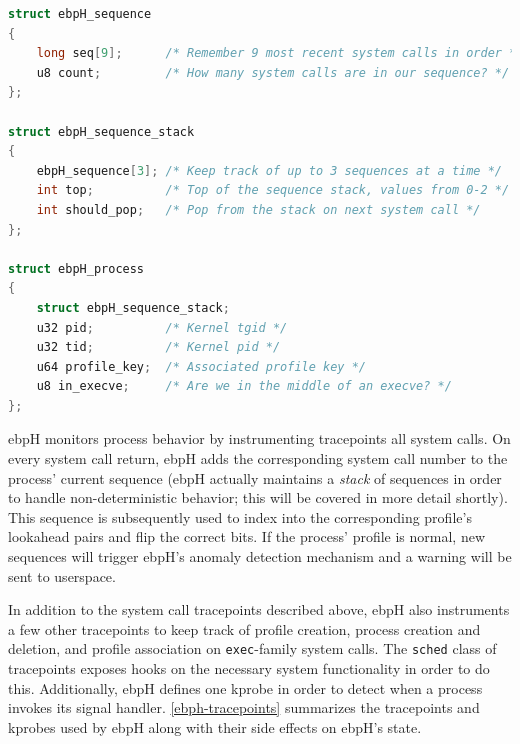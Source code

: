 \documentclass[
  12pt]{findlay}
\newcommand{\passthrough}[1]{#1}
\begin{document}
\begin{lstlisting}[language=c, label={ebph-process-struct}, caption={A simplified
definition of the ebpH process struct.}]
struct ebpH_sequence
{
    long seq[9];      /* Remember 9 most recent system calls in order */
    u8 count;         /* How many system calls are in our sequence? */
};

struct ebpH_sequence_stack
{
    ebpH_sequence[3]; /* Keep track of up to 3 sequences at a time */
    int top;          /* Top of the sequence stack, values from 0-2 */
    int should_pop;   /* Pop from the stack on next system call */
};

struct ebpH_process
{
    struct ebpH_sequence_stack;
    u32 pid;          /* Kernel tgid */
    u32 tid;          /* Kernel pid */
    u64 profile_key;  /* Associated profile key */
    u8 in_execve;     /* Are we in the middle of an execve? */
};
\end{lstlisting}

ebpH monitors process behavior by instrumenting tracepoints all system
calls. On every system call return, ebpH adds the corresponding system
call number to the process' current sequence (ebpH actually maintains a
\emph{stack} of sequences in order to handle non-deterministic behavior;
this will be covered in more detail shortly). This sequence is
subsequently used to index into the corresponding profile's lookahead
pairs and flip the correct bits. If the process' profile is normal, new
sequences will trigger ebpH's anomaly detection mechanism and a warning
will be sent to userspace.

In addition to the system call tracepoints described above, ebpH also
instruments a few other tracepoints to keep track of profile creation,
process creation and deletion, and profile association on
\passthrough{\lstinline!exec!}-family system calls. The
\passthrough{\lstinline!sched!} class of tracepoints exposes hooks on
the necessary system functionality in order to do this. Additionally,
ebpH defines one kprobe in order to detect when a process invokes its
signal handler. \autoref{ebph-tracepoints} summarizes the tracepoints
and kprobes used by ebpH along with their side effects on ebpH's state.
\end{document}
